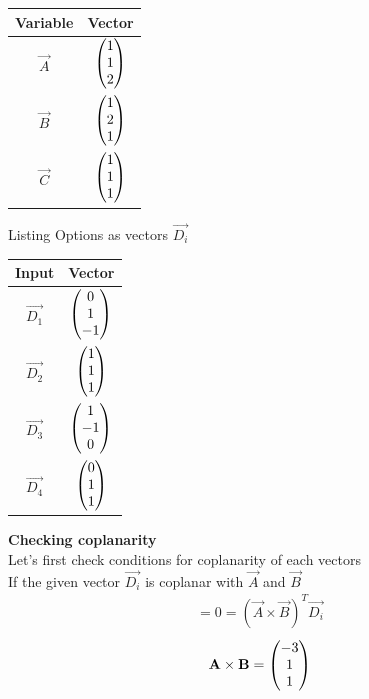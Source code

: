 \documentclass[12pt]{article}
\begin{document}
\begin{center}
\begin{tabular}{|c|c|}
\hline
Variable & Vector \\ \hline
$\Vec{A}$ & $\begin{pmatrix}1 \\ 1\\2\end{pmatrix}$\\ \hline
$\Vec{B}$ & $\begin{pmatrix}1 \\ 2\\ 1 \end{pmatrix}$\\ \hline
$\Vec{C}$ & $\begin{pmatrix}1\\ 1\\1\end{pmatrix}$\\ \hline

\end{tabular}
\end{center}
Listing Options as vectors $\vec{D_i}$
\begin{center}
\begin{tabular}{|c|c|}
\hline
Input & Vector \\ \hline
$\Vec{D_1}$ & $\begin{pmatrix}0\\ 1\\-1\end{pmatrix}$\\ \hline
$\Vec{D_2}$ & $\begin{pmatrix}1\\ 1\\1\end{pmatrix}$\\ \hline
$\Vec{D_3}$ & $\begin{pmatrix}1\\ -1\\0\end{pmatrix}$\\ \hline
$\Vec{D_4}$ & $\begin{pmatrix}0\\ 1\\1\end{pmatrix}$\\ \hline

\end{tabular}
\end{center}
\newpage
\textbf{\large Checking coplanarity}\\
\vspace{1cm}
Let's first check conditions for coplanarity of each vectors\\
\vspace{1cm}
If the given vector $\vec{D_i}$ is coplanar with $\Vec{A}$ and $\Vec{B}$
\begin{align}
  [\vec{A}\ \vec{B}\ \vec{D_i}]=0=(\vec{A}\times\vec{B})^T\vec{D_i}
\end{align}
\begin{align}
    \mathbf{A}\times\mathbf{B}=\begin{pmatrix}-3\\ 1 \\ 1\end{pmatrix} 
\end{align}
\end{document}
